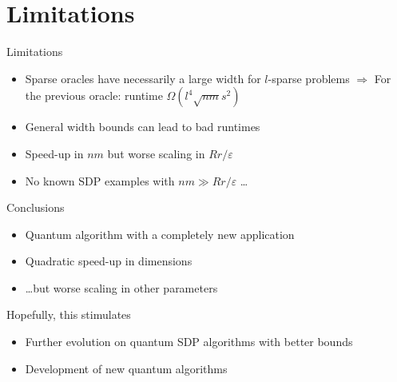 \section{Limitations}

\begin{frame}{Limitations}
 
 \begin{itemize}
  \item Sparse oracles have necessarily a large width for $l$-sparse problems $\Rightarrow$ For the previous oracle: runtime $\Omega( l^4 \sqrt{nm} s^2)$
  \item General width bounds can lead to bad runtimes 
 \end{itemize}
 
 \vspace{2\floatsep}
 
 \begin{itemize}
  \item Speed-up in $nm$ but worse scaling in  $Rr/\varepsilon$
  \item No known SDP examples with $nm \gg  Rr/\varepsilon$ \dots
 \end{itemize}


\end{frame}

\begin{frame}{Conclusions}

\begin{itemize}
 \item Quantum algorithm with a completely new application
 \item Quadratic speed-up in dimensions
 \item \dots but worse scaling in other parameters
\end{itemize}

\vspace{\floatsep}

Hopefully, this stimulates 
\begin{itemize}
 \item Further evolution on quantum SDP algorithms with better bounds
 \item Development of new quantum algorithms
\end{itemize}



\end{frame}
